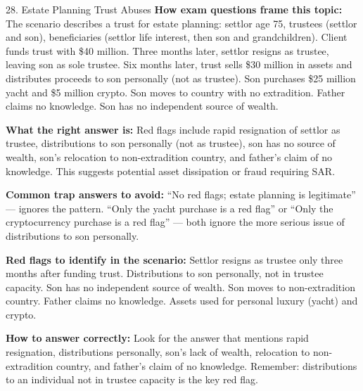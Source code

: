 \documentclass[11pt,a4paper]{beamer}
\begin{document}
	\begin{frame}{28. Estate Planning Trust Abuses}
		\tiny
		\noindent\textbf{How exam questions frame this topic:} The scenario describes a trust for estate planning: settlor age 75, trustees (settlor and son), beneficiaries (settlor life interest, then son and grandchildren). Client funds trust with \$40 million. Three months later, settlor resigns as trustee, leaving son as sole trustee. Six months later, trust sells \$30 million in assets and distributes proceeds to son personally (not as trustee). Son purchases \$25 million yacht and \$5 million crypto. Son moves to country with no extradition. Father claims no knowledge. Son has no independent source of wealth.
		
		\vspace{0.1cm}
		\noindent\textbf{What the right answer is:} Red flags include rapid resignation of settlor as trustee, distributions to son personally (not as trustee), son has no source of wealth, son's relocation to non-extradition country, and father's claim of no knowledge. This suggests potential asset dissipation or fraud requiring SAR.
		
		\vspace{0.1cm}
		\noindent\textbf{Common trap answers to avoid:} “No red flags; estate planning is legitimate” — ignores the pattern. “Only the yacht purchase is a red flag” or “Only the cryptocurrency purchase is a red flag” — both ignore the more serious issue of distributions to son personally.
		
		\vspace{0.1cm}
		\noindent\textbf{Red flags to identify in the scenario:} Settlor resigns as trustee only three months after funding trust. Distributions to son personally, not in trustee capacity. Son has no independent source of wealth. Son moves to non-extradition country. Father claims no knowledge. Assets used for personal luxury (yacht) and crypto.
		
		\vspace{0.1cm}
		\noindent\textbf{How to answer correctly:} Look for the answer that mentions rapid resignation, distributions personally, son's lack of wealth, relocation to non-extradition country, and father's claim of no knowledge. Remember: distributions to an individual not in trustee capacity is the key red flag.
	\end{frame}
	
\end{document}
